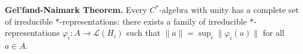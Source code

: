 \textbf{Gel'fand-Naimark Theorem.} Every $C^*$-algebra with unity has a complete set of irreducible $*$-representations: there exists a family of irreducible $*$-representations $\varphi_i: A \to \mathcal{L}(H_i)$ such that $\|a\| = \sup_i \|\varphi_i(a)\|$ for all $a \in A$.

